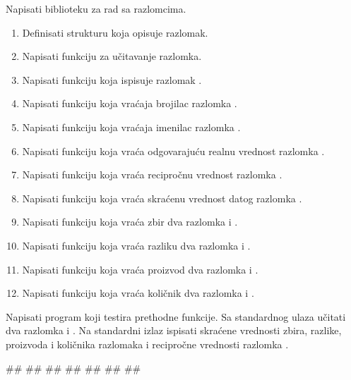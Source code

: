 \begin{Exercise}[label=1_04] %
Napisati biblioteku za rad sa razlomcima.
  \begin{enumerate}
  \item Definisati strukturu  koja opisuje razlomak.
  \item Napisati funkciju  za učitavanje razlomka.
  \item Napisati funkciju  koja ispisuje razlomak .
  \item Napisati funkciju  koja vraćaja brojilac razlomka .
   \item Napisati funkciju  koja vraćaja imenilac razlomka .
  \item Napisati funkciju  koja vraća odgovarajuću realnu vrednost razlomka .
  \item Napisati funkciju   koja vraća recipročnu vrednost
    razlomka .
  \item Napisati funkciju  koja vraća skraćenu vrednost datog razlomka .
  \item Napisati funkciju  koja vraća zbir dva razlomka  i .
 \item Napisati funkciju  koja vraća razliku dva razlomka  i .
 \item Napisati funkciju  koja vraća proizvod dva razlomka  i .
 \item Napisati funkciju  koja vraća količnik dva razlomka  i .
\end{enumerate}
Napisati program koji testira prethodne funkcije. Sa standardnog ulaza učitati dva razlomka  i . Na standardni izlaz ispisati skraćene vrednosti zbira, razlike, proizvoda i količnika
razlomaka  i recipročne vrednosti razlomka .

\begin{maxitest}
\begin{upotreba}{1}
#\naslovInt#
##
##
##
##
##
##
\end{upotreba}
\end{maxitest}



\end{Exercise}

